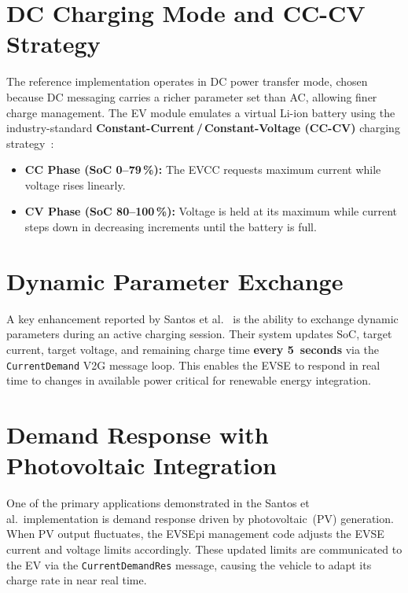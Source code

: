 \documentclass[12pt,a4paper]{report}
\begin{document}
\section{DC Charging Mode and CC-CV Strategy}

The reference implementation operates in DC power transfer mode, chosen because DC messaging
carries a richer parameter set than AC, allowing finer charge management. The EV module
emulates a virtual Li-ion battery using the industry-standard
\textbf{Constant-Current\,/\,Constant-Voltage (CC-CV)} charging strategy~\autocite{santos2024}:

\begin{itemize}
  \item \textbf{CC Phase (SoC 0--79\,\%):} The EVCC requests maximum current while voltage rises
        linearly.

  \item \textbf{CV Phase (SoC 80--100\,\%):} Voltage is held at its maximum while current steps
        down in decreasing increments until the battery is full.
\end{itemize}

\section{Dynamic Parameter Exchange}

A key enhancement reported by Santos et al.~\autocite{santos2024} is the ability to exchange
dynamic parameters during an active charging session. Their system updates SoC, target current,
target voltage, and remaining charge time \textbf{every 5~seconds} via the
\texttt{CurrentDemand} V2G message loop. This enables the EVSE to respond in real time to
changes in available power  critical for renewable energy integration.

\section{Demand Response with Photovoltaic Integration}

One of the primary applications demonstrated in the Santos et al.\ implementation is demand
response driven by photovoltaic~(PV) generation. When PV output fluctuates, the EVSEpi
management code adjusts the EVSE current and voltage limits accordingly. These updated limits
are communicated to the EV via the \texttt{CurrentDemandRes} message, causing the vehicle to
adapt its charge rate in near real time.
\end{document}
